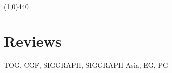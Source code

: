 \documentclass[margin,line]{resume}
\begin{document}
\begin{resume}


    \vspace{-5.0mm}
    \line(1,0){440}
    \vspace{-5.0mm}

    \section{\mysidestyle Reviews}

    TOG, CGF, SIGGRAPH, SIGGRAPH Asia, EG, PG                    \\






\end{resume}


\end{document}
